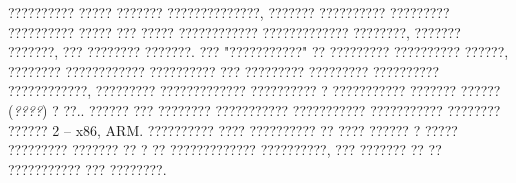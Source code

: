 ?????????? ????? ??????? ??????????????, ??????? ?????????? ????????? ?????????? ????? ??? ????? ???????????? ????????????? ????????, ??????? ???????, ??? ???????? ???????.  ??? "???????????" ?? ????????? ?????????? ??????, ???????? ???????????? ?????????? ??? ????????? ????????? ?????????? ????????????, ????????? ????????????? ?????????? ? ??????????? ??????? ?????? (\emph{????}) ? ??..  ?????? ??? ???????? ??????????? ??????????? ??????????? ???????? ?????? 2 -- x86, ARM.  ?????????? ???? ?????????? ?? ???? ?????? ? ????? ????????? ??????? ?? ? ?? ????????????? ??????????, ??? ??????? ?? ?? ??????????? ??? ????????.